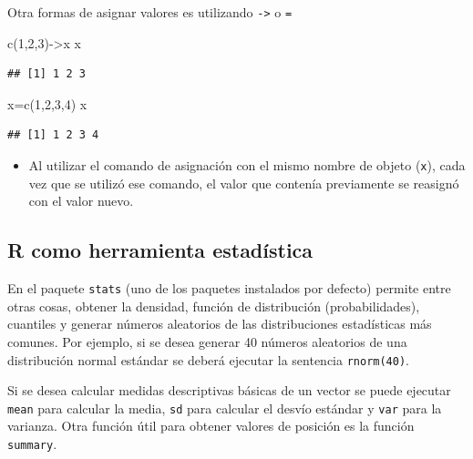 \documentclass[
]{book}
\newenvironment{Shaded}{\begin{snugshade}}{\end{snugshade}}
\newcommand{\DecValTok}[1]{\textcolor[rgb]{0.00,0.00,0.81}{#1}}
\newcommand{\FunctionTok}[1]{\textcolor[rgb]{0.00,0.00,0.00}{#1}}
\newcommand{\NormalTok}[1]{#1}
\newcommand{\OtherTok}[1]{\textcolor[rgb]{0.56,0.35,0.01}{#1}}
\newenvironment{rmdblock}[1]
{\begin{shaded*}
		\begin{itemize}
			\renewcommand{\labelitemi}{
				\raisebox{-.7\height}[0pt][0pt]{
					{\setkeys{Gin}{width=3em,keepaspectratio}\texttt{[image: images/\#1]}}
				}
			}
			\item
		}
		{
		\end{itemize}
	\end{shaded*}
}
\newenvironment{rmdnote}
{\begin{rmdblock}{note}}
	{\end{rmdblock}}
\begin{document}
Otra formas de asignar valores es utilizando \texttt{-\textgreater{}} o \texttt{=}

\begin{Shaded}
\begin{Highlighting}[]
\FunctionTok{c}\NormalTok{(}\DecValTok{1}\NormalTok{,}\DecValTok{2}\NormalTok{,}\DecValTok{3}\NormalTok{)}\OtherTok{{-}\textgreater{}}\NormalTok{x}
\NormalTok{x}
\end{Highlighting}
\end{Shaded}

\begin{verbatim}
## [1] 1 2 3
\end{verbatim}

\begin{Shaded}
\begin{Highlighting}[]
\NormalTok{x}\OtherTok{=}\FunctionTok{c}\NormalTok{(}\DecValTok{1}\NormalTok{,}\DecValTok{2}\NormalTok{,}\DecValTok{3}\NormalTok{,}\DecValTok{4}\NormalTok{)}
\NormalTok{x}
\end{Highlighting}
\end{Shaded}

\begin{verbatim}
## [1] 1 2 3 4
\end{verbatim}

\begin{rmdnote}
Al utilizar el comando de asignación con el mismo nombre de objeto
(\texttt{x}), cada vez que se utilizó ese comando, el valor que contenía
previamente se reasignó con el valor nuevo.
\end{rmdnote}

\hypertarget{r-como-herramienta-estaduxedstica}{%
\subsection{R como herramienta estadística}\label{r-como-herramienta-estaduxedstica}}

En el paquete \texttt{stats} (uno de los paquetes instalados por defecto) permite entre otras cosas, obtener la densidad, función de distribución (probabilidades), cuantiles y generar números aleatorios de las distribuciones estadísticas más comunes. Por ejemplo, si se desea generar 40 números aleatorios de una distribución normal estándar se deberá ejecutar la sentencia \texttt{rnorm(40)}.

Si se desea calcular medidas descriptivas básicas de un vector se puede ejecutar \texttt{mean} para calcular la media, \texttt{sd} para calcular el desvío estándar y \texttt{var} para la varianza. Otra función útil para obtener valores de posición es la función \texttt{summary}.
\end{document}
